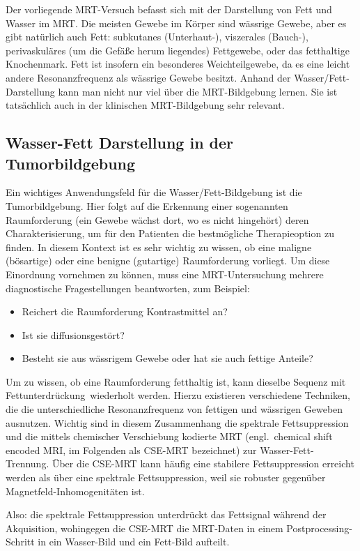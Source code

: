 \documentclass[a4paper,11pt]{article}
\begin{document}
Der vorliegende MRT-Versuch befasst sich mit der Darstellung von Fett und Wasser im MRT. Die meisten Gewebe im Körper sind wässrige Gewebe, aber es gibt natürlich auch Fett: subkutanes (Unterhaut-), viszerales (Bauch-), perivaskuläres (um die Gefäße herum liegendes) Fettgewebe, oder das fetthaltige Knochenmark. Fett ist insofern ein besonderes Weichteilgewebe, da es eine leicht andere Resonanzfrequenz als wässrige Gewebe besitzt. Anhand der Wasser/Fett-Darstellung kann man nicht nur viel über die MRT-Bildgebung lernen. Sie ist tatsächlich auch in der klinischen MRT-Bildgebung sehr relevant.

\subsection{Wasser-Fett Darstellung in der Tumorbildgebung}
Ein wichtiges Anwendungsfeld für die Wasser/Fett-Bildgebung ist die Tumorbildgebung. Hier folgt auf die Erkennung einer sogenannten Raumforderung (\glqq ein Gewebe wächst dort, wo es nicht hingehört\grqq) deren Charakterisierung, um für den Patienten die bestmögliche Therapieoption zu finden. In diesem Kontext ist es sehr wichtig zu wissen, ob eine maligne (bösartige) oder eine benigne (gutartige) Raumforderung vorliegt. Um diese Einordnung vornehmen zu können, muss eine MRT-Untersuchung mehrere diagnostische Fragestellungen beantworten, zum Beispiel:
\begin{itemize}
\item Reichert die Raumforderung Kontrastmittel an?
\item Ist sie diffusionsgestört?
\item Besteht sie aus wässrigem Gewebe oder hat sie auch fettige Anteile?
\end{itemize}
Um zu wissen, ob eine Raumforderung fetthaltig ist, kann dieselbe Sequenz \glqq mit Fettunterdrückung\grqq\ wiederholt werden. Hierzu existieren verschiedene Techniken, die die unterschiedliche Resonanzfrequenz von fettigen und wässrigen Geweben ausnutzen. Wichtig sind in diesem Zusammenhang die spektrale Fettsuppression und die mittels chemischer Verschiebung kodierte MRT (engl.\ \glqq chemical shift encoded MRI\grqq, im Folgenden als CSE-MRT bezeichnet) zur Wasser-Fett-Trennung. Über die CSE-MRT kann häufig eine stabilere Fettsuppression erreicht werden als über eine spektrale Fettsuppression, weil sie robuster gegenüber Magnetfeld-Inhomogenitäten ist.

Also: die spektrale Fettsuppression unterdrückt das Fettsignal während der Akquisition, wohingegen die CSE-MRT die MRT-Daten in einem Postprocessing-Schritt in ein Wasser-Bild und ein Fett-Bild aufteilt.
\end{document}
